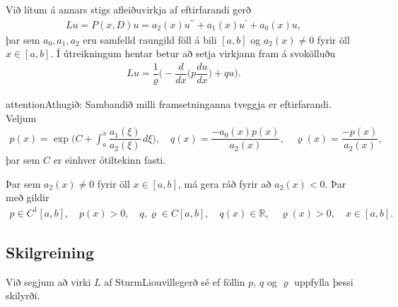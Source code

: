 \documentclass[a4paper,10pt,icelandic]{sphinxmanual}
\begin{document}
Við lítum á annars stigs afleiðuvirkja af eftirfarandi gerð
\begin{equation*}
\begin{split}Lu=P(x,D)u= a_2(x) u{{^{\prime\prime}}}+a_1(x)u{{^{\prime}}}+ a_0(x)u,\end{split}
\end{equation*}
þar sem \(a_0,a_1,a_2\) eru samfelld raungild föll á bili \([a,b]\) og \(a_2(x)\neq 0\) fyrir öll
\(x\in [a,b]\). Í útreikningum hentar betur að setja virkjann fram á svokölluðu 
\begin{equation*}
\begin{split}Lu ={{\dfrac {1}{\varrho}
 \bigg(-\dfrac d{dx}\bigg(p\dfrac {du}{dx}\bigg)+qu\bigg)}}.\end{split}
\end{equation*}
\begin{sphinxadmonition}{attention}{Athugið:}
Sambandið milli framsetninganna tveggja er eftirfarandi. Veljum
\begin{equation*}
\begin{split}p(x)=\exp\bigg(C +\int_a^x\dfrac{a_1({\xi})}{a_2({\xi})}\, d{\xi}\bigg),
\quad
q(x)=\dfrac{-a_0(x)p(x)}{a_2(x)}, \quad
{\varrho}(x)=\dfrac{-p(x)}{a_2(x)},\end{split}
\end{equation*}
þar sem \(C\) er einhver ótiltekinn fasti.
\end{sphinxadmonition}

Þar sem \(a_2(x)\neq 0\) fyrir öll \(x\in [a,b]\), má gera ráð fyrir
að \(a_2(x)<0\). Þar með gildir
\begin{equation*}
\begin{split}p\in C^1[a,b], \quad p(x)>0, \quad q,{\varrho}\in C[a,b], \quad q(x)\in {{\mathbb  R}},
 \quad {\varrho}(x)>0, \quad x\in [a,b].\end{split}
\end{equation*}

\subsection{Skilgreining}
\label{\detokenize{Kafli03:skilgreining}}
Við segjum að virki \(L\) af Sturm\textendash{}Liouville\textendash{}gerð sé  ef
föllin \(p\), \(q\) og \({\varrho}\) uppfylla þessi skilyrði.
\end{document}
